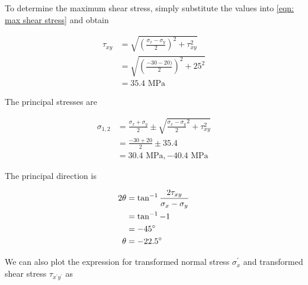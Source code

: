 \documentclass[
10pt,
a4paper,
openany,
svgnames,
]{book} %
\begin{document}
\begin{solution}
  To determine the maximum shear stress, simply substitute the values into \cref{eqn: max shear stress} and obtain
  
  \begin{align*}
    \tau_{xy} &= \sqrt {\left( \frac{\sigma_x - \sigma_y}{2} \right)^2 + \tau _{xy}^2}  \\ 
                 &= \sqrt {\left( \frac{-30 - 20)}{2} \right)^2 + 25^2}  \\ 
                 &= 35.4 \text{ MPa} 
  \end{align*}
  
  The principal stresses are

  \begin{align*}
    \sigma_{1,2} &= \frac{\sigma_x + \sigma _y}{2} \pm \sqrt {\frac{\sigma _x - \sigma_y}{2}^2 + \tau _{xy}^2}  \\ 
                    &= \frac{-30 + 20}{2} \pm 35.4 \\ 
                    &= 30.4 \text{ MPa}, - 40.4 \text{ MPa} 
  \end{align*}
  
  The principal direction is

  \begin{align*}
    2\theta  &= \tan^{-1}\frac{2\tau_{xy}}{\sigma_x - \sigma_y} \\ 
             &= \tan^{-1} -1 \\ 
             &= -45\degree \\
    \theta  &= -22.5\degree
  \end{align*}

  We can also plot the expression for transformed normal stress $\sigma_x^\prime $ and transformed shear stress $\tau_{x^\prime y^\prime}$ as

  \begin{figure}[H]
    \centering
  \end{figure}


\end{solution}
\end{document}

